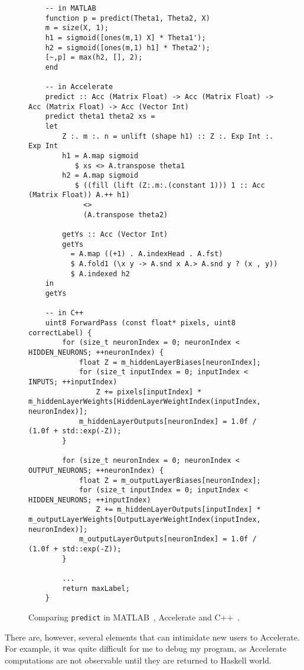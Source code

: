 \begin{figure}
  \begin{lstlisting}
	-- in MATLAB
	function p = predict(Theta1, Theta2, X)
	m = size(X, 1);
	h1 = sigmoid([ones(m,1) X] * Theta1');
	h2 = sigmoid([ones(m,1) h1] * Theta2');
	[~,p] = max(h2, [], 2);
	end
	  	
	-- in Accelerate  	
  	predict :: Acc (Matrix Float) -> Acc (Matrix Float) -> Acc (Matrix Float) -> Acc (Vector Int)
    predict theta1 theta2 xs = 
    let
        Z :. m :. n = unlift (shape h1) :: Z :. Exp Int :. Exp Int
        h1 = A.map sigmoid 
           $ xs <> A.transpose theta1                
        h2 = A.map sigmoid 
           $ ((fill (lift (Z:.m:.(constant 1))) 1 :: Acc (Matrix Float)) A.++ h1)
             <>
             (A.transpose theta2)

        getYs :: Acc (Vector Int)
        getYs
          = A.map ((+1) . A.indexHead . A.fst)
          $ A.fold1 (\x y -> A.snd x A.> A.snd y ? (x , y))
          $ A.indexed h2
    in
    getYs
  	
  	-- in C++
	uint8 ForwardPass (const float* pixels, uint8 correctLabel) {
        for (size_t neuronIndex = 0; neuronIndex < HIDDEN_NEURONS; ++neuronIndex) {
            float Z = m_hiddenLayerBiases[neuronIndex];
            for (size_t inputIndex = 0; inputIndex < INPUTS; ++inputIndex)
                Z += pixels[inputIndex] * m_hiddenLayerWeights[HiddenLayerWeightIndex(inputIndex, neuronIndex)];
            m_hiddenLayerOutputs[neuronIndex] = 1.0f / (1.0f + std::exp(-Z));
        }
 
        for (size_t neuronIndex = 0; neuronIndex < OUTPUT_NEURONS; ++neuronIndex) {
            float Z = m_outputLayerBiases[neuronIndex];
            for (size_t inputIndex = 0; inputIndex < HIDDEN_NEURONS; ++inputIndex)
                Z += m_hiddenLayerOutputs[inputIndex] * m_outputLayerWeights[OutputLayerWeightIndex(inputIndex, neuronIndex)];
            m_outputLayerOutputs[neuronIndex] = 1.0f / (1.0f + std::exp(-Z));
        }

        ...
        return maxLabel;
    }
  \end{lstlisting}
  \caption{Comparing \texttt{predict} in MATLAB~\cite{Ng12}, Accelerate and C++~\cite{Wol17}.}
  \label{fig:eval.syntax.predict}
\end{figure}

There are, however, several elements that can intimidate new users to Accelerate. For example, it was quite difficult for me to debug my program, as Accelerate computations are not observable until they are returned to Haskell world. 

